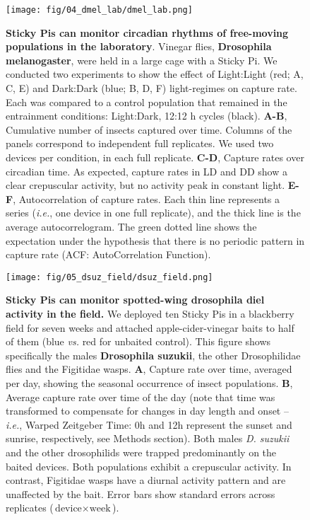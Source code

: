 \documentclass[12pt]{article}
\begin{document}
	\pagebreak

	\begin{figure}[ht]
		\centering
		\texttt{[image: fig/04\_dmel\_lab/dmel\_lab.png]}
		\caption{\textbf{Sticky Pis can monitor circadian rhythms of free-moving populations in the laboratory}. Vinegar flies, \textbf{Drosophila melanogaster}, were held in a large cage with a Sticky Pi. We conducted two experiments to show the effect of Light:Light (red; A, C, E) and Dark:Dark (blue; B, D, F) light-regimes on capture rate. Each was compared to a control population that remained in the entrainment conditions: Light:Dark, 12:12 h cycles (black). \textbf{A-B}, Cumulative number of insects captured over time. Columns of the panels correspond to independent full replicates. We used two devices per condition, in each full replicate. \textbf{C-D}, Capture rates over circadian time. As expected, capture rates in LD and DD show a clear crepuscular activity, but no activity peak in constant light. \textbf{E-F}, Autocorrelation of capture rates. Each thin line represents a series (\emph{i.e.}, one device in one full replicate), and the thick line is the average autocorrelogram. The green dotted line shows the expectation under the hypothesis that there is no periodic pattern in capture rate (ACF: AutoCorrelation Function).
		}
		\label{fig:04}
	\end{figure}

	\pagebreak

	\begin{figure}[ht]
		\centering
		\texttt{[image: fig/05\_dsuz\_field/dsuz\_field.png]}
		\caption{\textbf{Sticky Pis can monitor spotted-wing drosophila diel activity in the field.} We deployed ten Sticky Pis in a blackberry field for seven weeks and attached apple-cider-vinegar baits to half of them (blue \emph{vs.} red for unbaited control). This figure shows specifically the males \textbf{Drosophila suzukii}, the other Drosophilidae flies and the Figitidae wasps. \textbf{A}, Capture rate over time, averaged per day, showing the seasonal occurrence of insect populations. \textbf{B}, Average capture rate over time of the day (note that time was transformed to compensate for changes in day length and onset – \emph{i.e.}, Warped Zeitgeber Time: 0h and 12h represent the sunset and sunrise, respectively, see Methods section). Both males \emph{D. suzukii} and the other drosophilids were trapped predominantly on the baited devices. Both populations exhibit a crepuscular activity. In contrast, Figitidae wasps have a diurnal activity pattern and are unaffected by the bait. Error bars show standard errors across replicates ($\text{device} \times{} \text{week}$).}
		\label{fig:05}
	\end{figure}
\end{document}
